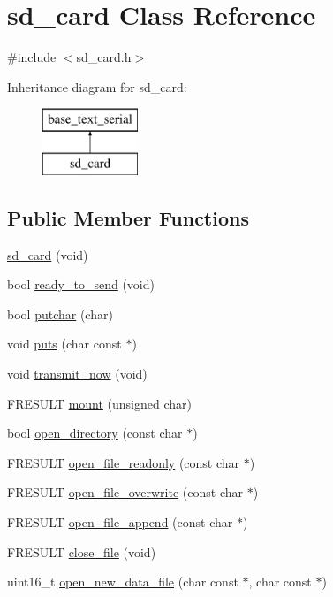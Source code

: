 \hypertarget{classsd__card}{\section{sd\-\_\-card Class Reference}
\label{classsd__card}
}


{\ttfamily \#include $<$sd\-\_\-card.\-h$>$}

Inheritance diagram for sd\-\_\-card\-:\begin{figure}[H]
\begin{center}
\leavevmode
\includegraphics[height=2.000000cm]{classsd__card}
\end{center}
\end{figure}
\subsection*{Public Member Functions}
\begin{DoxyCompactItemize}
\item 
\hyperlink{classsd__card_a53258f2e1f42807f2c9238d66b8ca5fc}{sd\-\_\-card} (void)
\item 
bool \hyperlink{classsd__card_ace9426af93920e3819887fec13d89adb}{ready\-\_\-to\-\_\-send} (void)
\item 
bool \hyperlink{classsd__card_a24780513a0db84cd83cbd5d77437981b}{putchar} (char)
\item 
void \hyperlink{classsd__card_afadf1e3a3b449e9ab992ac147a837562}{puts} (char const $\ast$)
\item 
void \hyperlink{classsd__card_ac718cadb3664d40cd96bd107470b271f}{transmit\-\_\-now} (void)
\item 
F\-R\-E\-S\-U\-L\-T \hyperlink{classsd__card_ad62e39a6a46a6697f511d3cbef9627ae}{mount} (unsigned char)
\item 
bool \hyperlink{classsd__card_aeac919f2d31c96d9e67520c28917b09e}{open\-\_\-directory} (const char $\ast$)
\item 
F\-R\-E\-S\-U\-L\-T \hyperlink{classsd__card_a0e81d537338e6bcb69a7623087272ca7}{open\-\_\-file\-\_\-readonly} (const char $\ast$)
\item 
F\-R\-E\-S\-U\-L\-T \hyperlink{classsd__card_a90cb0c0eb0dd6e91704f11329721742b}{open\-\_\-file\-\_\-overwrite} (const char $\ast$)
\item 
F\-R\-E\-S\-U\-L\-T \hyperlink{classsd__card_ab322608cfd9fc6ac8544d681fe09b34f}{open\-\_\-file\-\_\-append} (const char $\ast$)
\item 
F\-R\-E\-S\-U\-L\-T \hyperlink{classsd__card_ad8edd6731e877aed7b4cd953a5f4b78d}{close\-\_\-file} (void)
\item 
uint16\-\_\-t \hyperlink{classsd__card_a01bf6f40225a91995831f6341eacccbe}{open\-\_\-new\-\_\-data\-\_\-file} (char const $\ast$, char const $\ast$)
\end{DoxyCompactItemize}
